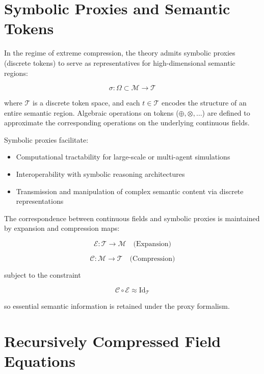 \section{Symbolic Proxies and Semantic Tokens}

In the regime of extreme compression, the theory admits symbolic proxies (discrete tokens) to serve as representatives for high-dimensional semantic regions:

\begin{equation}
\sigma: \Omega \subset \mathcal{M} \to \mathcal{T}
\end{equation}

where \(\mathcal{T}\) is a discrete token space, and each \(t \in \mathcal{T}\) encodes the structure of an entire semantic region. Algebraic operations on tokens (\(\oplus, \otimes, \ldots\)) are defined to approximate the corresponding operations on the underlying continuous fields.

Symbolic proxies facilitate:
\begin{itemize}
    \item Computational tractability for large-scale or multi-agent simulations
    \item Interoperability with symbolic reasoning architectures
    \item Transmission and manipulation of complex semantic content via discrete representations
\end{itemize}

The correspondence between continuous fields and symbolic proxies is maintained by expansion and compression maps:

\begin{equation}
\mathcal{E}: \mathcal{T} \to \mathcal{M} \quad \text{(Expansion)}
\end{equation}

\begin{equation}
\mathcal{C}: \mathcal{M} \to \mathcal{T} \quad \text{(Compression)}
\end{equation}

subject to the constraint

\begin{equation}
\mathcal{C} \circ \mathcal{E} \approx \mathrm{Id}_{\mathcal{T}}
\end{equation}

so essential semantic information is retained under the proxy formalism.

\section{Recursively Compressed Field Equations}

